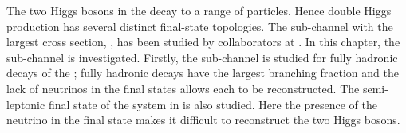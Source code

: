 


The two Higgs bosons in the  \eeToHH decay to a range of particles. Hence  double Higgs production has several distinct final-state topologies. The sub-channel with the largest cross section, \eeToHHbbbb, has been studied by \CLIC collaborators at \CERN. In this chapter, the \eeToHHbbWW sub-channel  is investigated. Firstly, the \eeToHHbbWW sub-channel is studied for fully hadronic decays of the \WW; fully hadronic \WW decays have the largest branching fraction and the lack of neutrinos in the final states allows each \PW to be reconstructed. The semi-leptonic final state of the \WW system in \eeToHHbbWW is also studied. Here the presence of the neutrino in the final state makes it  difficult to reconstruct the two Higgs bosons.




